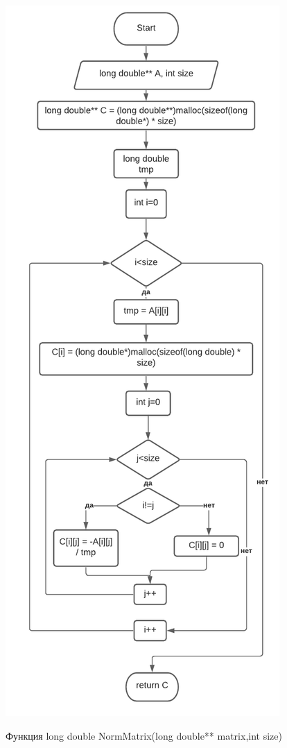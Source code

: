 \includegraphics[scale=0.5]{block3.pdf}

Функция long double NormMatrix(long double** matrix,int size)


